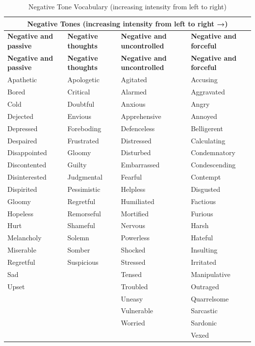 \documentclass[a4paper]{article}
\begin{document}
\begin{longtable}{|p{3.5cm}|p{3.5cm}|p{3.5cm}|p{3.5cm}|}
\caption{Negative Tone Vocabulary (increasing intensity from left to right)} \label{tab:negativetones} \\
\hline
\multicolumn{4}{|c|}{\textbf{Negative Tones (increasing intensity from left to right →)}} \\
\hline
\textbf{Negative and passive} & \textbf{Negative thoughts} & \textbf{Negative and uncontrolled} & \textbf{Negative and forceful} \\
\hline
\endfirsthead

\hline
\textbf{Negative and passive} & \textbf{Negative thoughts} & \textbf{Negative and uncontrolled} & \textbf{Negative and forceful} \\
\hline
\endhead

\hline
\endfoot

Apathetic & Apologetic & Agitated & Accusing \\
Bored & Critical & Alarmed & Aggravated \\
Cold & Doubtful & Anxious & Angry \\
Dejected & Envious & Apprehensive & Annoyed \\
Depressed & Foreboding & Defenceless & Belligerent \\
Despaired & Frustrated & Distressed & Calculating \\
Disappointed & Gloomy & Disturbed & Condemnatory \\
Discontented & Guilty & Embarrassed & Condescending \\
Disinterested & Judgmental & Fearful & Contempt \\
Dispirited & Pessimistic & Helpless & Disgusted \\
Gloomy & Regretful & Humiliated & Factious \\
Hopeless & Remorseful & Mortified & Furious \\
Hurt & Shameful & Nervous & Harsh \\
Melancholy & Solemn & Powerless & Hateful \\
Miserable & Somber & Shocked & Insulting \\
Regretful & Suspicious & Stressed & Irritated \\
Sad &  & Tensed & Manipulative \\
Upset &  & Troubled & Outraged \\
 &  & Uneasy & Quarrelsome \\
 &  & Vulnerable & Sarcastic \\
 &  & Worried & Sardonic \\
 &  &  & Vexed \\
\hline

\end{longtable}
\end{document}
